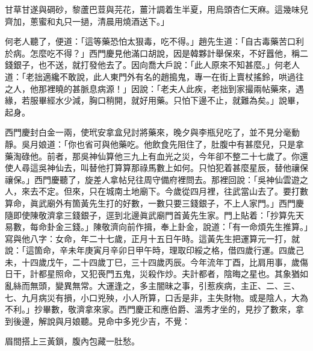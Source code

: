 \begin{myquote}
甘草甘遂與碙砂，黎蘆巴荳與芫花，薑汁調着生半夏，用烏頭杏仁天麻。這幾味兒齊加，蔥蜜和丸只一撾，清晨用燒酒送下。」
\end{myquote}

何老人聽了，便道：「這等藥恐怕太狠毒，吃不得。」趙先生道：「自古毒藥苦口利於病。怎麼吃不得？」西門慶見他滿口胡說，因是韓夥計舉保來，不好囂他，稱二錢銀子，也不送，就打發他去了。因向喬大戶說：「此人原來不知甚麼。」何老人道：「老拙適纔不敢說，此人東門外有名的趙搗鬼，專一在街上賣杖搖鈴，哄過往之人，他那裡曉的甚脈息病源！」因說：「老夫人此疾，老拙到家撮兩帖藥來，遇緣，若服畢經水少減，胸口稍開，就好用藥。只怕下邊不止，就難為矣。」說畢，起身。

西門慶封白金一兩，使玳安拿盒兒討將藥來，晚夕與李瓶兒吃了，並不見分毫動靜。吳月娘道：「你也省可與他藥吃。他飲食先阻住了，肚腹中有甚麼兒，只是拿藥淘碌他。{}前者，那吳神仙算他三九上有血光之災，今年卻不整二十七歲了。你還使人尋這吳神仙去，叫替他打算算那祿馬數上如何。只怕犯着甚麼星辰，替他禳保禳保。」西門慶聽了，旋差人拿帖兒往周守備府裡問去。那裡回說：「吳神仙雲遊之人，來去不定。但來，只在城南土地廟下。今歲從四月裡，往武當山去了。要打數算命，眞武廟外有箇黃先生打的好數，一數只要三錢銀子，不上人家門。」西門慶隨即使陳敬濟拿三錢銀子，逕到北邊眞武廟門首黃先生家。{}門上貼着：「抄算先天易數，每命卦金三錢。」陳敬濟向前作揖，奉上卦金，說道：「有一命煩先生推算。」寫與他八字：女命，年二十七歲，正月十五日午時。這黃先生把運算元一打，就說：「這箇命，辛未年庚寅月辛卯日甲午時，理取印綏之格，借四歲行運。四歲己未，十四歲戊午，二十四歲丁巳，三十四歲丙辰。今年流年丁酉，比肩用事，歲傷日干，計都星照命，又犯䘮門五鬼，災殺作炒。夫計都者，陰晦之星也。其象猶如亂絲而無頭，變異無常。大運逢之，多主闇昧之事，引惹疾病，主正、二、三、七、九月病災有損，小口兇殃，小人所算，口舌是非，主失財物。或是陰人，大為不利。」{}抄畢數，敬濟拿來家。西門慶正和應伯爵、溫秀才坐的，見抄了數來，拿到後邊，解說與月娘聽。見命中多兇少吉，不覺：

\begin{myquote}
眉間搭上三黃鎖，腹內包藏一肚愁。
\end{myquote}

